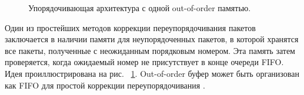 \begin{figure}[ht]
\begin{center}

\caption{
\label{out-of-order}
     Упорядочивающая архитектура с одной out-of-order памятью.}
\end {center}
\end {figure}

Один из простейших методов коррекции переупорядочивания пакетов заключается в наличии памяти для неупорядоченных пакетов, в которой хранятся все пакеты, полученные с неожиданным порядковым номером. Эта память затем проверяется, когда ожидаемый номер не присутствует в конце очереди FIFO. Идея проиллюстрирована на рис. ~\ref{out-of-order}. Out-of-order буфер может быть организован как FIFO для простой коррекции переупорядочивания \cite{v15}.

\pagebreak